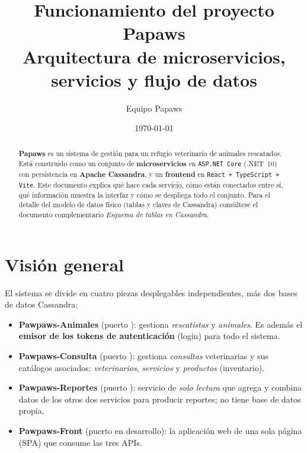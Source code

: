 \documentclass[11pt,a4paper]{article}
\title{\textbf{\color{moss}Funcionamiento del proyecto Papaws}\\[0.3em]
\large Arquitectura de microservicios, servicios y flujo de datos}
\author{Equipo Papaws}
\date{\today}
\begin{document}
\maketitle

\begin{abstract}
\noindent
\textbf{Papaws} es un sistema de gestión para un refugio veterinario de animales
rescatados. Está construido como un conjunto de \textbf{microservicios} en
\texttt{ASP.NET Core} (.NET~10) con persistencia en \textbf{Apache Cassandra}, y
un \textbf{frontend} en \texttt{React + TypeScript + Vite}. Este documento explica
qué hace cada servicio, cómo están conectados entre sí, qué información muestra la
interfaz y cómo se despliega todo el conjunto. Para el detalle del modelo de datos
físico (tablas y claves de Cassandra) consúltese el documento complementario
\emph{Esquema de tablas en Cassandra}.
\end{abstract}

\tableofcontents
\vspace{1em}

\section{Visión general}

El sistema se divide en cuatro piezas desplegables independientes, más dos bases
de datos Cassandra:

\begin{itemize}[leftmargin=1.4em]
  \item \textbf{Pawpaws-Animales} (puerto ): gestiona
        \emph{rescatistas} y \emph{animales}. Es además el \textbf{emisor de los
        tokens de autenticación} (login) para todo el sistema.
  \item \textbf{Pawpaws-Consulta} (puerto ): gestiona
        \emph{consultas} veterinarias y sus catálogos asociados:
        \emph{veterinarios}, \emph{servicios} y \emph{productos} (inventario).
  \item \textbf{Pawpaws-Reportes} (puerto ): servicio de
        \emph{solo lectura} que agrega y combina datos de los otros dos servicios
        para producir reportes; no tiene base de datos propia.
  \item \textbf{Pawpaws-Front} (puerto  en desarrollo): la
        aplicación web de una sola página (SPA) que consume las tres APIs.
\end{itemize}
\end{document}
